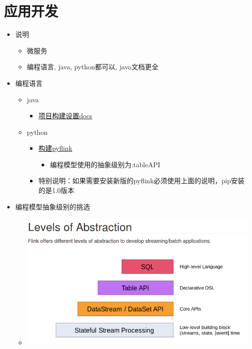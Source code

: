 \documentclass[11pt]{article}
\begin{document}
\section{应用开发}
\label{sec-2}
\begin{itemize}
\item 说明
\begin{itemize}
\item 微服务
\item 编程语言, java, python都可以, java文档更全
\end{itemize}
\item 编程语言
\begin{itemize}
\item java
\begin{itemize}
\item \href{https://ci.apache.org/projects/flink/flink-docs-release-1.9/zh/dev/projectsetup/java_api_quickstart.html}{项目构建设置docs}
\end{itemize}
\item python
\begin{itemize}
\item \href{https://ci.apache.org/projects/flink/flink-docs-release-1.9/zh/flinkDev/building.html#build-pyflink}{构建pyflink}
\begin{itemize}
\item 编程模型使用的抽象级别为:tableAPI
\end{itemize}
\item 特别说明：如果需要安装新版的pyflink必须使用上面的说明，pip安装的是1.0版本
\end{itemize}
\end{itemize}
\item 编程模型抽象级别的挑选
\begin{itemize}
\item \includegraphics[width=.9\linewidth]{./material/编程模型抽象级别.png}
\end{itemize}
\end{itemize}
\end{document}
